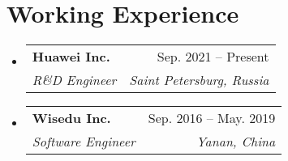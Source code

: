\documentclass[letterpaper,10pt]{article}
\makeatletter
\newcommand{\resumeItem}[1]{
  \item\small{
    {#1 \vspace{-2pt}}
  }
}
\newcommand{\resumeSubheading}[4]{
  \vspace{-2pt}\item
  \begin{tabular*}{0.97\textwidth}[t]{l@{\extracolsep{\fill}}r}
    \textbf{#1} & #2 \\
    \textit{\small#3} & \textit{\small #4} \\
  \end{tabular*}\vspace{-7pt}
}
\newenvironment{resumeSubHeadingList}{\begin{itemize}[leftmargin=0.15in, label={}]}{\end{itemize}}
\newenvironment{resumeItemList}{\begin{itemize}}{\end{itemize}}
\makeatother
\begin{document}
\section{Working Experience}
\begin{resumeSubHeadingList}

  \resumeSubheading
    {Huawei Inc.}{Sep. 2021 -- Present}
    {R\&D Engineer}{Saint Petersburg, Russia}
  \resumeSubheading
    {Wisedu Inc.}{Sep. 2016 -- May. 2019}
    {Software Engineer}{Yanan, China}



\end{resumeSubHeadingList}
\end{document}
